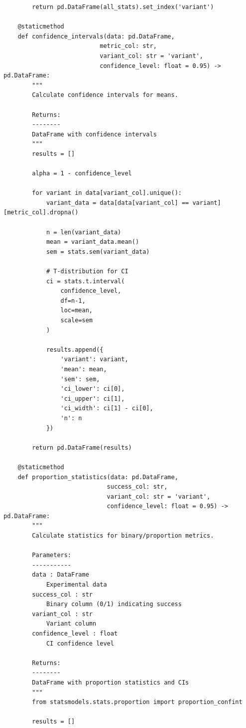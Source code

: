 \begin{lstlisting}
        return pd.DataFrame(all_stats).set_index('variant')

    @staticmethod
    def confidence_intervals(data: pd.DataFrame,
                           metric_col: str,
                           variant_col: str = 'variant',
                           confidence_level: float = 0.95) -> pd.DataFrame:
        """
        Calculate confidence intervals for means.

        Returns:
        --------
        DataFrame with confidence intervals
        """
        results = []

        alpha = 1 - confidence_level

        for variant in data[variant_col].unique():
            variant_data = data[data[variant_col] == variant][metric_col].dropna()

            n = len(variant_data)
            mean = variant_data.mean()
            sem = stats.sem(variant_data)

            # T-distribution for CI
            ci = stats.t.interval(
                confidence_level,
                df=n-1,
                loc=mean,
                scale=sem
            )

            results.append({
                'variant': variant,
                'mean': mean,
                'sem': sem,
                'ci_lower': ci[0],
                'ci_upper': ci[1],
                'ci_width': ci[1] - ci[0],
                'n': n
            })

        return pd.DataFrame(results)

    @staticmethod
    def proportion_statistics(data: pd.DataFrame,
                             success_col: str,
                             variant_col: str = 'variant',
                             confidence_level: float = 0.95) -> pd.DataFrame:
        """
        Calculate statistics for binary/proportion metrics.

        Parameters:
        -----------
        data : DataFrame
            Experimental data
        success_col : str
            Binary column (0/1) indicating success
        variant_col : str
            Variant column
        confidence_level : float
            CI confidence level

        Returns:
        --------
        DataFrame with proportion statistics and CIs
        """
        from statsmodels.stats.proportion import proportion_confint

        results = []


\end{lstlisting}
